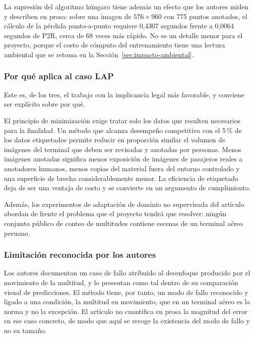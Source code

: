 La supresión del algoritmo húngaro tiene además un efecto que los autores
miden y describen en prosa: sobre una imagen de $576\times960$ con 775
puntos anotados, el cálculo de la pérdida punto-a-punto requiere 0,4307
segundos frente a 0,0064 segundos de P2R, cerca de 68 veces más rápido.
No es un detalle menor para el proyecto, porque el costo de cómputo del
entrenamiento tiene una lectura ambiental que se retoma en la
Sección~\ref{sec:impacto-ambiental}.

\subsubsection*{Por qué aplica al caso LAP}

Este es, de los tres, el trabajo con la implicancia legal más favorable,
y conviene ser explícito sobre por qué.

El principio de minimización exige tratar solo los datos que resulten
necesarios para la finalidad. Un método que alcanza desempeño competitivo
con el 5\,\% de los datos etiquetados permite reducir en proporción
similar el volumen de imágenes del terminal que deben ser revisadas y
anotadas por personas. Menos imágenes anotadas significa menos exposición
de imágenes de pasajeros reales a anotadores humanos, menos copias del
material fuera del entorno controlado y una superficie de brecha
considerablemente menor. La eficiencia de etiquetado deja de ser una
ventaja de costo y se convierte en un argumento de cumplimiento.

Además, los experimentos de adaptación de dominio no supervisada del
artículo abordan de frente el problema que el proyecto tendrá que
resolver: ningún conjunto público de conteo de multitudes contiene
escenas de un terminal aéreo peruano.

\subsubsection*{Limitación reconocida por los autores}

Los autores documentan un caso de fallo atribuido al desenfoque producido
por el movimiento de la multitud, y lo presentan como tal dentro de su
comparación visual de predicciones. El método tiene, por tanto, un modo
de fallo reconocido y ligado a una condición, la multitud en movimiento,
que en un terminal aéreo es la norma y no la excepción. El artículo
no cuantifica en prosa la magnitud del error en ese caso concreto, de
modo que aquí se recoge la existencia del modo de fallo y no su tamaño.

